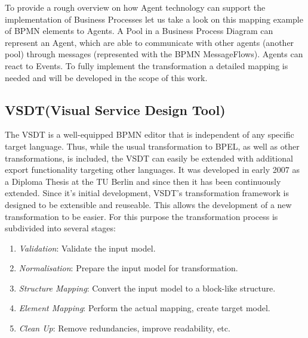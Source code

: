 To provide a rough overview on how Agent technology can support the implementation of Business Processes let us take a look on this mapping example of BPMN elements to Agents. A Pool in a Business Process Diagram can represent an Agent, which are able to communicate with other agents (another pool) through messages (represented with the BPMN MessageFlows). Agents can react to Events. To fully implement the transformation a detailed mapping is needed and will be developed in the scope of this work. 

\subsection{VSDT(Visual Service Design Tool)}
The VSDT \cite{5,2,3,1} is a well-equipped BPMN editor that is independent of any specific target language. Thus, while the usual transformation to BPEL, as well as other transformations, is included, the VSDT can easily be extended with additional export functionality targeting other languages. It was developed in early 2007 as a Diploma Thesis at the TU Berlin and since then it has been continuously extended. Since it's initial development, VSDT's transformation framework is designed to be extensible and reuseable. This allows the development of a new transformation to be easier. For this purpose the transformation process is subdivided into several stages: 
\begin{enumerate}
	\item \textit{Validation}: Validate the input model.
	\item \textit{Normalisation}: Prepare the input model for transformation.
	\item \textit{Structure Mapping}: Convert the input model to a block-like structure.
	\item \textit{Element Mapping}: Perform the actual mapping, create target model.
	\item \textit{Clean Up}: Remove redundancies, improve readability, etc.
\end{enumerate}

